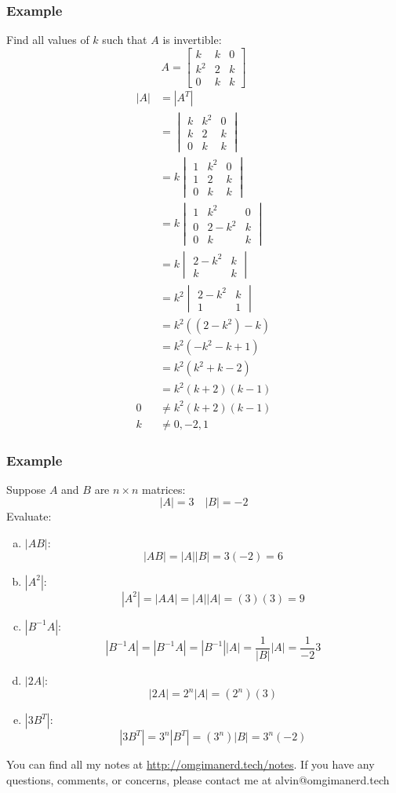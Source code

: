 \documentclass[letterpaper, 12pt]{math}
\begin{document}
\subsubsection*{Example}
Find all values of \( k \) such that \( A \) is invertible:
\[ A = \begin{bmatrix}k & k & 0 \\ k^2 & 2 & k \\ 0 & k & k\end{bmatrix} \]
\begin{align*}
  |A| &= |A^T| \\
  &= \begin{vmatrix}
    k & k^2 & 0 \\
    k & 2 & k \\
    0 & k & k
  \end{vmatrix} \\
  &= k\begin{vmatrix}
    1 & k^2 & 0 \\
    1 & 2 & k \\
    0 & k & k
  \end{vmatrix} \\
  &= k\begin{vmatrix}
    1 & k^2 & 0 \\
    0 & 2-k^2 & k \\
    0 & k & k
  \end{vmatrix} \\
  &= k\begin{vmatrix}
    2-k^2 & k \\
    k & k
  \end{vmatrix} \\
  &= k^2\begin{vmatrix}
    2-k^2 & k \\
    1 & 1
  \end{vmatrix} \\
  &= k^2((2-k^2)-k) \\
  &= k^2(-k^2-k+1) \\
  &= k^2(k^2+k-2) \\
  &= k^2(k+2)(k-1) \\
  0 &\ne k^2(k+2)(k-1) \\
  k &\ne 0,-2,1
\end{align*}

\subsubsection*{Example}
Suppose \( A \) and \( B \) are \( n\times n \) matrices:
\[ |A| = 3 \quad |B| = -2\]
Evaluate:
\begin{enumerate}[(a)]
  \item \( |AB| \):
  \[ |AB| = |A||B| = 3(-2) = 6 \]
  \item \( |A^2| \):
  \[ |A^2| = |AA| = |A||A| = (3)(3) = 9 \]
  \item \( |B^{-1}A| \):
  \[ |B^{-1}A| = |B^{-1}A| = |B^{-1}||A| = \frac{1}{|B|}|A| = \frac{1}{-2}3 \]
  \item \( |2A| \):
  \[ |2A| = 2^n|A| = (2^n)(3) \]
  \item \( |3B^T| \):
  \[ |3B^T| = 3^n|B^T| = (3^n)|B| = 3^n(-2) \]
\end{enumerate}

\begin{center}
  You can find all my notes at \url{http://omgimanerd.tech/notes}. If you have
  any questions, comments, or concerns, please contact me at
  alvin@omgimanerd.tech
\end{center}
\end{document}
